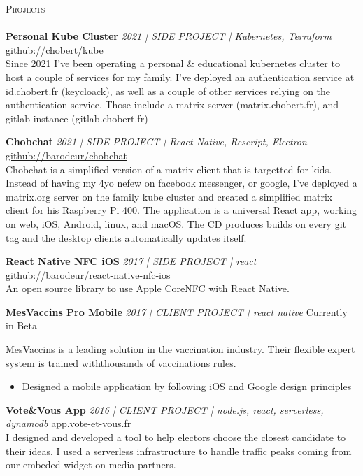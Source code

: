 \documentclass[a4paper]{article}
\newcommand{\hrefgithub} [1] {
    \href{https://github.com/#1}{github://#1}
}
\newcommand{\lineunder} {
    \vspace*{-8pt} \\
    \hspace*{-18pt} \hrulefill \\
}
\newcommand{\header} [1] {
    {\hspace*{-18pt}\vspace*{6pt} \textsc{#1}}
    \vspace*{-6pt} \lineunder
}
\begin{document}
\header{Projects}
{\textbf{Personal Kube Cluster} \sl 2021 | SIDE PROJECT | Kubernetes, Terraform} \hfill \hrefgithub{chobert/kube}\\
Since 2021 I've been operating a personal \& educational kubernetes cluster to host a couple of services for my family.
I've deployed an authentication service at id.chobert.fr (keycloack), as well as a couple of other services
relying on the authentication service. Those include a matrix server (matrix.chobert.fr),
and gitlab instance (gitlab.chobert.fr)
\vspace*{2mm}

{\textbf{Chobchat} \sl 2021 | SIDE PROJECT | React Native, Rescript, Electron} \hfill \hrefgithub{barodeur/chobchat}\\
Chobchat is a simplified version of a matrix client that is targetted for kids.
Instead of having my 4yo nefew on facebook messenger, or google, I've deployed a matrix.org server on the family kube cluster
and created a simplified matrix client for his Raspberry Pi 400.
The application is a universal React app, working on web, iOS, Android, linux, and macOS.
The CD produces builds on every git tag and the desktop clients automatically updates itself.
\vspace*{2mm}

{\textbf{React Native NFC iOS} \sl 2017 | SIDE PROJECT | react} \hfill \hrefgithub{barodeur/react-native-nfc-ios}\\
An open source library to use Apple CoreNFC with React Native.
\vspace*{2mm}

{\textbf{MesVaccins Pro Mobile} \sl 2017 | CLIENT PROJECT | react native} \hfill Currently in Beta\\
\begin{itshape}
MesVaccins is a leading solution in the vaccination industry.
Their flexible expert system is trained withthousands of vaccinations rules.
\end{itshape}

\vspace{-\topsep}
\begin{itemize}
    \item Designed a mobile application by following iOS and Google design principles
\end{itemize}
\vspace{-\topsep}

\vspace*{2mm}

{\textbf{Vote\&Vous App} \sl 2016 | CLIENT PROJECT | node.js, react, serverless, dynamodb} \hfill app.vote-et-vous.fr\\
I designed and developed a tool to help electors choose the closest candidate to their ideas.
I used a serverless infrastructure to handle traffic peaks coming from our embeded widget on media partners.
\vspace*{2mm}
\end{document}
